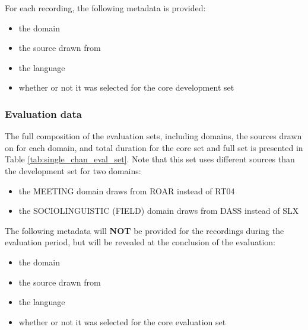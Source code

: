 \documentclass{article}
\begin{document}
%
For each recording, the following metadata is provided:
    \begin{itemize}
        \item the domain
        \item the source drawn from
        \item the language
        \item whether or not it was selected for the core development set
    \end{itemize}


\subsubsection{Evaluation data}
The full composition of the evaluation sets, including domains, the sources drawn on for each domain, and total duration for the core set and full set is presented in Table \ref{tab:single_chan_eval_set}. Note that this set uses different sources than the development set for two domains:
    \begin{itemize}
        \item the MEETING domain draws from ROAR instead of RT04
        \item the SOCIOLINGUISTIC (FIELD) domain draws from DASS instead of SLX
    \end{itemize}
The following metadata will {\bf NOT} be provided for the recordings during the evaluation period, but will be revealed at the conclusion of the evaluation:
% 
    \begin{itemize}
        \item the domain
        \item the source drawn from
        \item the language
        \item whether or not it was selected for the core evaluation set
    \end{itemize}
%
\end{document}
